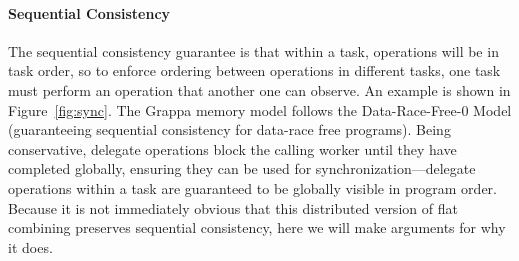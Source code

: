 


\paragraph{Sequential Consistency}
The sequential consistency guarantee is that within a task, operations will be in task order, so to enforce ordering between operations in different tasks, one task must perform an operation that another one can observe. An example is shown in Figure~\ref{fig:sync}.
The Grappa memory model follows the Data-Race-Free-0 Model (guaranteeing sequential consistency for data-race free programs). Being conservative, delegate operations block the calling worker until they have completed globally, ensuring they can be used for synchronization---delegate operations within a task are guaranteed to be globally visible in program order.
Because it is not immediately obvious that this distributed version of flat combining preserves sequential consistency, here we will make arguments for why it does.

